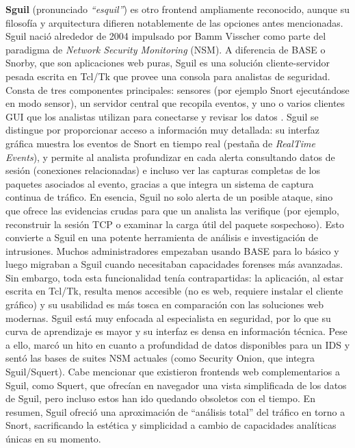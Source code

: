 \documentclass[11pt,a4paper,twoside]{report}
\begin{document}
\textbf{Sguil} (pronunciado \textit{“esquil”}) es otro frontend ampliamente reconocido, aunque su filosofía y arquitectura difieren notablemente de las opciones antes mencionadas. Sguil nació alrededor de 2004 impulsado por Bamm Visscher como parte del paradigma de \textit{Network Security Monitoring} (NSM). A diferencia de BASE o Snorby, que son aplicaciones web puras, Sguil es una solución cliente-servidor pesada escrita en Tcl/Tk que provee una consola para analistas de seguridad. Consta de tres componentes principales: sensores (por ejemplo Snort ejecutándose en modo sensor), un servidor central que recopila eventos, y uno o varios clientes GUI que los analistas utilizan para conectarse y revisar los datos \cite{sectoolsSguil}. Sguil se distingue por proporcionar acceso a información muy detallada: su interfaz gráfica muestra los eventos de Snort en tiempo real (pestaña de \textit{RealTime Events}), y permite al analista profundizar en cada alerta consultando datos de sesión (conexiones relacionadas) e incluso ver las capturas completas de los paquetes asociados al evento, gracias a que integra un sistema de captura continua de tráfico. En esencia, Sguil no solo alerta de un posible ataque, sino que ofrece las evidencias crudas para que un analista las verifique (por ejemplo, reconstruir la sesión TCP o examinar la carga útil del paquete sospechoso). Esto convierte a Sguil en una potente herramienta de análisis e investigación de intrusiones. Muchos administradores empezaban usando BASE para lo básico y luego migraban a Sguil cuando necesitaban capacidades forenses más avanzadas. Sin embargo, toda esta funcionalidad tenía contrapartidas: la aplicación, al estar escrita en Tcl/Tk, resulta menos accesible (no es web, requiere instalar el cliente gráfico) y su usabilidad es más tosca en comparación con las soluciones web modernas. Sguil está muy enfocada al especialista en seguridad, por lo que su curva de aprendizaje es mayor y su interfaz es densa en información técnica. Pese a ello, marcó un hito en cuanto a profundidad de datos disponibles para un IDS y sentó las bases de suites NSM actuales (como Security Onion, que integra Sguil/Squert). Cabe mencionar que existieron frontends web complementarios a Sguil, como Squert, que ofrecían en navegador una vista simplificada de los datos de Sguil, pero incluso estos han ido quedando obsoletos con el tiempo. En resumen, Sguil ofreció una aproximación de “análisis total” del tráfico en torno a Snort, sacrificando la estética y simplicidad a cambio de capacidades analíticas únicas en su momento.\newline
\end{document}
